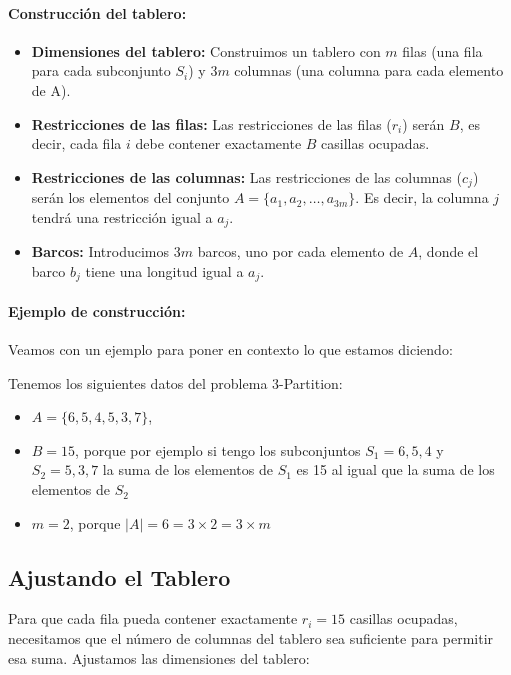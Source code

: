 \paragraph{Construcción del tablero:}
\begin{itemize}
    \item \textbf{Dimensiones del tablero:} Construimos un tablero con \(m\) filas (una fila para cada subconjunto \(S_i\)) y \(3m\) columnas (una columna para cada elemento de A).
    \item \textbf{Restricciones de las filas:} Las restricciones de las filas (\(r_i\)) serán \(B\), es decir, cada fila \(i\) debe contener exactamente \(B\) casillas ocupadas.
    \item \textbf{Restricciones de las columnas:} Las restricciones de las columnas (\(c_j\)) serán los elementos del conjunto \(A = \{a_1, a_2, \dots, a_{3m}\}\). Es decir, la columna \(j\) tendrá una restricción igual a \(a_j\).
    \item \textbf{Barcos:} Introducimos \(3m\) barcos, uno por cada elemento de \(A\), donde el barco \(b_j\) tiene una longitud igual a \(a_j\).
\end{itemize}

\paragraph{Ejemplo de construcción:}
Veamos con un ejemplo para poner en contexto lo que estamos diciendo:

\vskip0.5cm
Tenemos los siguientes datos del problema 3-Partition: 

\begin{itemize}
    \item $A = \{6, 5, 4, 5, 3, 7\}$,
    \item $B = 15$, porque por ejemplo si tengo los subconjuntos $S_{1}={6,5,4}$ y $S_{2}={5,3,7}$ la suma de los elementos de $S_{1}$ es 15 al igual que la suma de los elementos de $S_{2}$ 
    \item $m = 2$, porque $|A| = 6 = 3 \times 2 = 3 \times m$
\end{itemize}

\subsection*{Ajustando el Tablero}

Para que cada fila pueda contener exactamente $r_i = 15$ casillas ocupadas, necesitamos que el número de columnas del tablero sea suficiente para permitir esa suma. Ajustamos las dimensiones del tablero:

